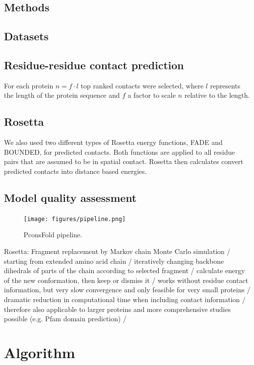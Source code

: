 \documentclass{bioinfo}
\begin{document}
\begin{methods}
\section{Methods}
\subsection{Datasets}
\cite[]{jones_PSICOV:_2012}
\subsection{Residue-residue contact prediction}
For each protein $n = f \cdot l$ top ranked contacts were selected, where $l$ represents the length of the protein sequence and $f$ a factor to scale $n$ relative to the length.
\subsection{Rosetta}
We also used two different types of Rosetta energy functions, FADE and BOUNDED, for predicted contacts. Both functions are applied to all residue pairs that are assumed to be in spatial contact. Rosetta then calculates convert predicted contacts into distance based energies. 
\subsection{Model quality assessment}

\begin{figure}[!tpb]%
    \centerline{\texttt{[image: figures/pipeline.png]}}
\caption{PconsFold pipeline.}\label{fig:main}
\end{figure}
Rosetta: Fragment replacement by Markov chain Monte Carlo simulation / starting from extended amino acid chain / iteratively changing backbone dihedrals of parts of the chain according to selected fragment / calculate energy of the new conformation, then keep or dismiss it / works without residue contact information, but very slow convergence and only feasible for very small proteins / dramatic reduction in computational time when including contact information / therefore also applicable to larger proteins and more comprehensive studies possible (e.g. Pfam domain prediction) / \\


\end{methods}
\section{Algorithm}
\end{document}
